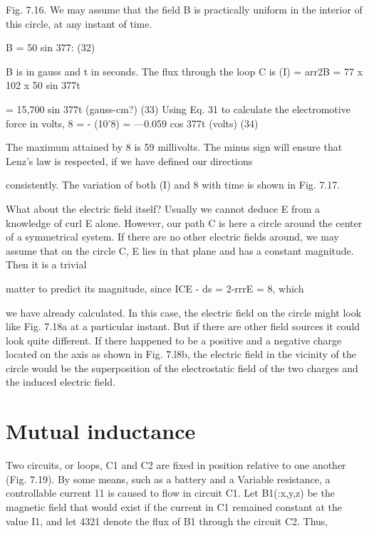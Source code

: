 Fig. 7.16. We may assume that the field B is practically uniform in
the interior of this circle, at any instant of time.

B = 50 sin 377: (32)

B is in gauss and t in seconds. The flux through the loop C is
(I) = arr2B = 77 x 102 x 50 sin 377t

= 15,700 sin 377t (gauss-cm?) (33)
Using Eq. 31 to calculate the electromotive force in volts,
8 = - (10'8)%
= ---0.059 cos 377t (volts) (34)

The maximum attained by 8 is 59 millivolts. The minus sign will
ensure that Lenz's law is respected, if we have defined our directions

consistently. The variation of both (I) and 8 with time is shown in
Fig. 7.17.

What about the electric field itself? Usually we cannot deduce
E from a knowledge of curl E alone. However, our path C is here a
circle around the center of a symmetrical system. If there are no
other electric fields around, we may assume that on the circle C, E lies
in that plane and has a constant magnitude. Then it is a trivial

matter to predict its magnitude, since ICE - ds = 2-rrrE = 8, which

we have already calculated. In this case, the electric field on the
circle might look like Fig. 7.18a at a particular instant. But if there
are other field sources it could look quite different. If there happened
to be a positive and a negative charge located on the axis as shown
in Fig. 7.l8b, the electric field in the vicinity of the circle would be
the superposition of the electrostatic field of the two charges and the
induced electric field.

 

 

\section{Mutual inductance}

Two circuits, or loops, C1 and C2 are fixed in position relative to
one another (Fig. 7.19). By some means, such as a battery and
a Variable resistance, a controllable current 11 is caused to flow in
circuit C1. Let B1(:x,y,z) be the magnetic field that would exist if
the current in C1 remained constant at the value I1, and let 4321 denote
the flux of B1 through the circuit C2. Thus,

